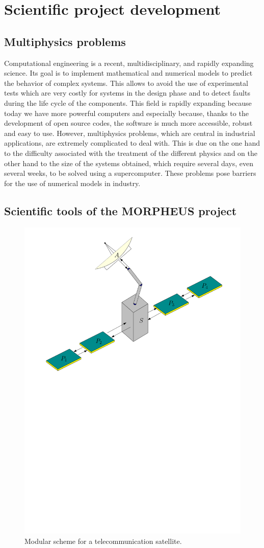 \documentclass[12pt]{article}
\begin{document}
	
	\section{Scientific project development}
	
	\subsection{Multiphysics problems}
	Computational engineering is a recent, multidisciplinary, and rapidly expanding science. Its goal is to implement mathematical and numerical models to predict the behavior of complex systems. This allows to avoid the use of experimental tests which are very costly for systems in the design phase and to detect faults during the life cycle of the components. This field is rapidly expanding because today we have more powerful computers and especially because, thanks to the development of open source codes, the software is much more accessible, robust and easy to use. However, multiphysics problems, which are central in industrial applications, are extremely complicated to deal with. This is due on the one hand to the difficulty associated with the treatment of the different physics and on the other hand to the size of the systems obtained, which require several days, even several weeks, to be solved using a supercomputer. These problems pose barriers for the use of numerical models in industry. 
	
	
	
	\subsection{Scientific tools of the MORPHEUS project}
	
	\begin{figure}[tb]
		\centering
		\includegraphics[width=.6\textwidth]{satellite.pdf}
		\caption{Modular scheme for a telecommunication satellite.}
		\label{fig:satellite}
	\end{figure}
	
\end{document}
